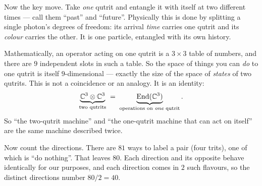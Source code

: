 \begin{plain}
Now the key move. Take \emph{one} qutrit and entangle it with itself at two different
times --- call them ``past'' and ``future''. Physically this is done by splitting a
single photon's degrees of freedom: its arrival \emph{time} carries one qutrit and its
\emph{colour} carries the other. It is one particle, entangled with its own history.

Mathematically, an operator acting on one qutrit is a $3\times 3$ table of numbers, and
there are $9$ independent slots in such a table. So the space of things you can \emph{do}
to one qutrit is itself $9$-dimensional --- exactly the size of the space of \emph{states}
of two qutrits. This is not a coincidence or an analogy. It is an identity:
\[
  \underbrace{\mathbb{C}^3\otimes\mathbb{C}^3}_{\text{two qutrits}}
  \;=\;
  \underbrace{\mathrm{End}(\mathbb{C}^3)}_{\text{operations on \emph{one} qutrit}}.
\]
So ``the two-qutrit machine'' and ``the one-qutrit machine that can act on itself'' are
the same machine described twice.

Now count the directions. There are $81$ ways to label a pair (four trits), one of which
is ``do nothing''. That leaves $80$. Each direction and its opposite behave identically
for our purposes, and each direction comes in $2$ such flavours, so the distinct
directions number $80/2=40$.
\end{plain}


\begin{center}
\end{center}

